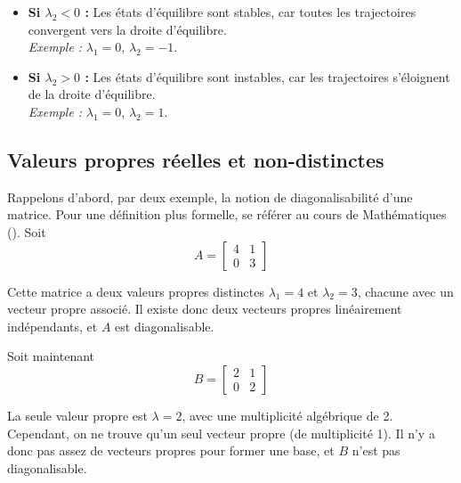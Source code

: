             \begin{itemize}
                \item \textbf{Si $\lambda_2 < 0$ :} Les états d'équilibre sont stables, car toutes les trajectoires convergent vers la droite d'équilibre. \\
                \textit{Exemple :} $\lambda_1 = 0$, $\lambda_2 = -1$.
                
                \item \textbf{Si $\lambda_2 > 0$ :} Les états d'équilibre sont instables, car les trajectoires s'éloignent de la droite d'équilibre. \\
                \textit{Exemple :} $\lambda_1 = 0$, $\lambda_2 = 1$.
            \end{itemize}

        \subsection{Valeurs propres réelles et non-distinctes}
            Rappelons d'abord, par deux exemple, la notion de diagonalisabilité d'une matrice. Pour une définition plus formelle, se référer au cours de Mathématiques (\cite{mathf117}). Soit
            \begin{equation}
                A = \begin{bmatrix}
                    4 & 1 \\
                    0 & 3
                \end{bmatrix}
            \end{equation}
            
            Cette matrice a deux valeurs propres distinctes $\lambda_1 = 4$ et $\lambda_2 = 3$, chacune avec un vecteur propre associé. Il existe donc deux vecteurs propres linéairement indépendants, et $A$ est diagonalisable.
            
            Soit maintenant
                \begin{equation}
                B = \begin{bmatrix}
                    2 & 1 \\
                    0 & 2
                    \end{bmatrix}
            \end{equation}
            
            La seule valeur propre est $\lambda = 2$, avec une multiplicité algébrique de 2. Cependant, on ne trouve qu’un seul vecteur propre (de multiplicité 1). Il n’y a donc pas assez de vecteurs propres pour former une base, et $B$ n’est pas diagonalisable.
            
